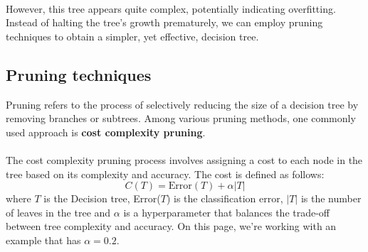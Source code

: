 \documentclass[11pt,a4paper]{report}
\begin{document}
\paragraph{}However, this tree appears quite complex, potentially indicating overfitting. Instead of halting the tree's growth prematurely, we can employ pruning techniques to obtain a simpler, yet effective, decision tree.
\subsection{Pruning techniques}
Pruning refers to the process of selectively reducing the size of a decision tree by removing branches or subtrees. Among various pruning methods, one commonly used approach is \textbf{cost complexity pruning}.
\paragraph{}The cost complexity pruning process involves assigning a cost to each node in the tree based on its complexity and accuracy. The cost is defined as follows:
$$C(T) = \textrm{Error}(T) + \alpha|T|$$
where $T$ is the Decision tree, Error($T$) is the classification error, $|T|$ is the number of leaves in the tree and $\alpha$ is a hyperparameter that balances the trade-off between tree complexity and accuracy. On this page, we're working with an example that has $\alpha=0.2$.
\end{document}
